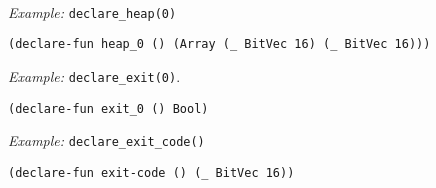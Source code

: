 ~\\
\noindent
\emph{Example:} \lstinline[style=c++]{declare_heap(0)}

\begin{lstlisting}[language=SMTLib]
(declare-fun heap_0 () (Array (_ BitVec 16) (_ BitVec 16)))
\end{lstlisting}

\noindent
\emph{Example:} \lstinline[style=c++]{declare_exit(0)}.

\begin{lstlisting}[language=SMTLib]
(declare-fun exit_0 () Bool)
\end{lstlisting}

\noindent
\emph{Example:} \lstinline[style=c++]{declare_exit_code()}

\begin{lstlisting}[language=SMTLib]
(declare-fun exit-code () (_ BitVec 16))
\end{lstlisting}


%
%
%

%


